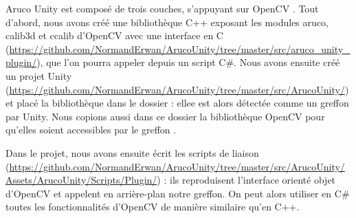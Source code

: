 
Aruco Unity est composé de trois couches, s'appuyant sur OpenCV . Tout d'abord, nous avons créé une bibliothèque C++ exposant les modules aruco, calib3d et ccalib d'OpenCV avec une interface en C (\url{https://github.com/NormandErwan/ArucoUnity/tree/master/src/aruco_unity_plugin/}), que l'on pourra appeler depuis un script C\#. Nous avons ensuite créé un projet Unity (\url{https://github.com/NormandErwan/ArucoUnity/tree/master/src/ArucoUnity/}) et placé la bibliothèque dans le dossier  : ellee est alors détectée comme un greffon par Unity. Nous copions aussi dans ce dossier la bibliothèque OpenCV pour qu'elles soient accessibles par le greffon .


Dans le projet, nous avons ensuite écrit les scripts de liaison (\url{https://github.com/NormandErwan/ArucoUnity/tree/master/src/ArucoUnity/Assets/ArucoUnity/Scripts/Plugin/}) : ils reproduisent l'interface orienté objet d'OpenCV et appelent en arrière-plan notre greffon. On peut alors utiliser en C\# toutes les fonctionnalités d'OpenCV de manière similaire qu'en C++.

